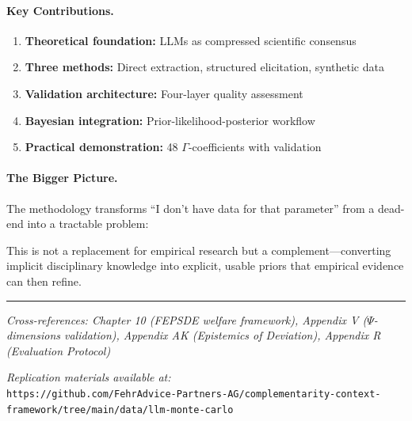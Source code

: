 \paragraph{Key Contributions.}
\begin{enumerate}
    \item \textbf{Theoretical foundation:} LLMs as compressed scientific consensus
    \item \textbf{Three methods:} Direct extraction, structured elicitation, synthetic data
    \item \textbf{Validation architecture:} Four-layer quality assessment
    \item \textbf{Bayesian integration:} Prior-likelihood-posterior workflow
    \item \textbf{Practical demonstration:} 48 $\Gamma$-coefficients with validation
\end{enumerate}

\paragraph{The Bigger Picture.}
The methodology transforms ``I don't have data for that parameter'' from a dead-end into a tractable problem:

\begin{center}
\end{center}

This is not a replacement for empirical research but a complement---converting implicit disciplinary knowledge into explicit, usable priors that empirical evidence can then refine.

\vspace{1em}
\hrule
\vspace{0.5em}
\noindent\textit{Cross-references: Chapter 10 (FEPSDE welfare framework), Appendix V ($\Psi$-dimensions validation), Appendix AK (Epistemics of Deviation), Appendix R (Evaluation Protocol)}

\vspace{1em}
\noindent\textit{Replication materials available at:}\\
\texttt{https://github.com/FehrAdvice-Partners-AG/complementarity-context-framework/tree/main/data/llm-monte-carlo}

